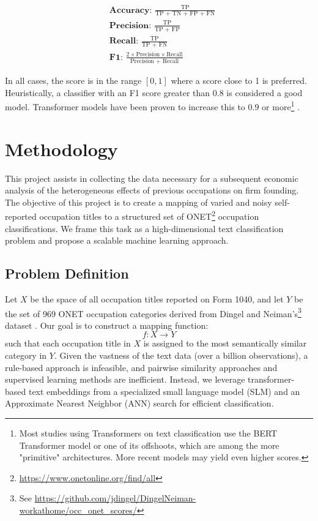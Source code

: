 \documentclass[12pt]{article}
\begin{document}
\begin{align*}
    &\textbf{Accuracy:  } \frac{\text{TP}}{\text{TP + TN + FP + FN}} \\
    & \textbf{Precision:  } \frac{\text{TP}}{\text{TP + FP}}\\
    &\textbf{Recall:  }\frac{\text{TP}}{\text{TP + FN}}\\
    &  \textbf{F1:  }  \frac{2 \times \text{Precision}\times \text{Recall}}{\text{Precision + Recall}}
\end{align*}

In all cases, the score is in the range $[0,1]$ where a score close to 1 is preferred. Heuristically, a classifier with an F1 score greater than $0.8$ is considered a good model. Transformer models have been proven to increase this to $0.9$ or more\footnote{Most studies using Transformers on text classification use the BERT Transformer model or one of its offshoots, which are among the more "primitive" architectures. More recent models may yield even higher scores.} \cite{lu2022comparative}\cite{transformer-text-class}\cite{gokhan-trans-text-class}. 

\section{Methodology}\label{sec:methodology}
This project assists in collecting the data necessary for a subsequent economic analysis of the heterogeneous effects of previous occupations on firm founding. The objective of this project is to create a mapping of varied and noisy self-reported occupation titles to a structured set of ONET\footnote{\href{https://www.onetonline.org/find/all}{https://www.onetonline.org/find/all}} occupation classifications. We frame this task as a high-dimensional text classification problem and propose a scalable machine learning approach.

\subsection{Problem Definition}

Let $X$ be the space of all occupation titles reported on Form 1040, and let $Y$ be the set of 969 ONET occupation categories derived from Dingel and Neiman's\footnote{See \href{https://github.com/jdingel/DingelNeiman-workathome/occ_onet_scores/output/occupations_workathome.csv}{https://github.com/jdingel/DingelNeiman-workathome/occ\_onet\_scores/}} dataset \cite{DINGEL2020} . 
Our goal is to construct a mapping function:
\[
f: X \to Y
\]
such that each occupation title in $X$ is assigned to the most semantically similar category in $Y$. Given the vastness of the text data (over a billion observations), a rule-based approach is infeasible, and pairwise similarity approaches and supervised learning methods are inefficient. Instead, we leverage transformer-based text embeddings from a specialized small language model (SLM) and an Approximate Nearest Neighbor (ANN) search for efficient classification.
\end{document}
